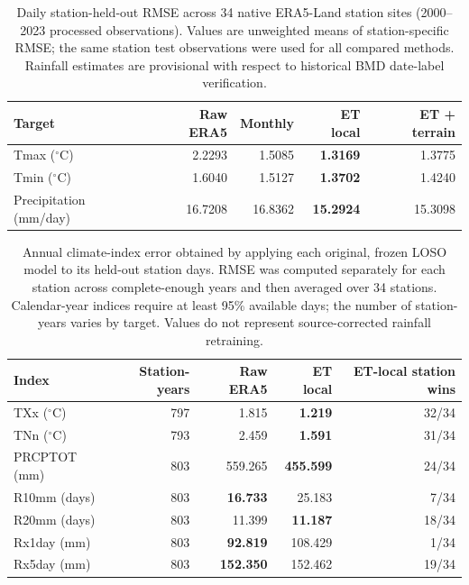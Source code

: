 
\begin{table}[t]
\centering
\caption{Daily station-held-out RMSE across 34 native ERA5-Land station sites (2000--2023 processed observations). Values are unweighted means of station-specific RMSE; the same station test observations were used for all compared methods. Rainfall estimates are provisional with respect to historical BMD date-label verification.}
\label{tab:loso_main}
\begin{tabular}{lrrrr}
\hline
Target & Raw ERA5 & Monthly & ET local & ET + terrain \\
\hline
Tmax ($^\circ$C) & 2.2293 & 1.5085 & \textbf{1.3169} & 1.3775 \\
Tmin ($^\circ$C) & 1.6040 & 1.5127 & \textbf{1.3702} & 1.4240 \\
Precipitation (mm/day) & 16.7208 & 16.8362 & \textbf{15.2924} & 15.3098 \\
\hline
\end{tabular}
\end{table}

\begin{table}[t]
\centering
\caption{Annual climate-index error obtained by applying each original, frozen LOSO model to its held-out station days. RMSE was computed separately for each station across complete-enough years and then averaged over 34 stations. Calendar-year indices require at least 95\% available days; the number of station-years varies by target. Values do not represent source-corrected rainfall retraining.}
\label{tab:climate_index}
\begin{tabular}{lrrrr}
\hline
Index & Station-years & Raw ERA5 & ET local & ET-local station wins \\
\hline
TXx ($^\circ$C) & 797 & 1.815 & \textbf{1.219} & 32/34 \\
TNn ($^\circ$C) & 793 & 2.459 & \textbf{1.591} & 31/34 \\
PRCPTOT (mm) & 803 & 559.265 & \textbf{455.599} & 24/34 \\
R10mm (days) & 803 & \textbf{16.733} & 25.183 & 7/34 \\
R20mm (days) & 803 & 11.399 & \textbf{11.187} & 18/34 \\
Rx1day (mm) & 803 & \textbf{92.819} & 108.429 & 1/34 \\
Rx5day (mm) & 803 & \textbf{152.350} & 152.462 & 19/34 \\
\hline
\end{tabular}
\end{table}

